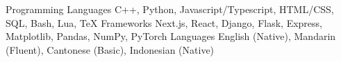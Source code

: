 

\begin{cvskills}

\cvskill
  {Programming Languages} %
  {C++, Python, Javascript/Typescript, HTML/CSS, SQL, Bash, Lua, \TeX{}} %
\cvskill
  {Frameworks} %
  {Next.js, React, Django, Flask, Express, Matplotlib, Pandas, NumPy, PyTorch} %
\cvskill
  {Languages} %
  {English (Native), Mandarin (Fluent), Cantonese (Basic), Indonesian (Native)} %

\end{cvskills}
